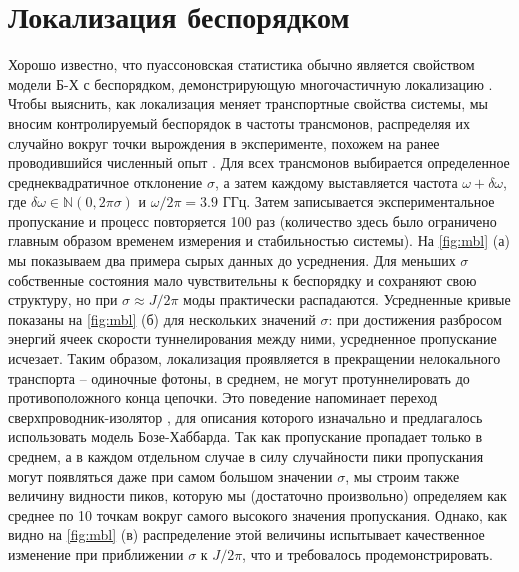 \documentclass[14pt, a4paper]{extreport}
\numberwithin{equation}{section}
\begin{document}
\section{Локализация беспорядком}

Хорошо известно, что пуассоновская статистика обычно является свойством модели Б-Х с беспорядком, демонстрирующую многочастичную локализацию \cite{roushan2017spectroscopic, Yan2019,Ye2019}. Чтобы выяснить, как локализация меняет транспортные свойства системы, мы вносим контролируемый беспорядок в частоты трансмонов, распределяя их случайно вокруг точки вырождения в эксперименте, похожем на ранее проводившийся численный опыт \cite{orell2019probing}. Для всех трансмонов выбирается определенное среднеквадратичное отклонение $\sigma$, а затем каждому выставляется частота $\omega + \delta \omega$, где $\delta \omega \in \mathbb{N}(0, 2\pi \sigma)$ и $\omega/2\pi = 3.9$ ГГц. Затем записывается экспериментальное пропускание и процесс повторяется 100 раз (количество здесь было ограничено главным образом временем измерения и стабильностью системы). На \autoref{fig:mbl} (а) мы показываем два примера сырых данных до усреднения. Для меньших $\sigma$ собственные состояния мало чувствительны к беспорядку и сохраняют свою структуру, но при $\sigma \approx J/2\pi$ моды практически распадаются. Усредненные кривые показаны на \autoref{fig:mbl} (б) для нескольких значений $\sigma$: при достижения разбросом энергий ячеек скорости туннелирования между ними, усредненное пропускание исчезает. Таким образом, локализация проявляется в прекращении нелокального транспорта -- одиночные фотоны, в среднем, не могут протуннелировать до противоположного конца цепочки. Это поведение напоминает переход сверхпроводник-изолятор \cite{bruder1993superconductor}, для описания которого изначально и предлагалось использовать модель Бозе-Хаббарда. Так как пропускание пропадает только в среднем, а в каждом отдельном случае в силу случайности пики пропускания могут появляться даже при самом большом значении $\sigma$, мы строим также величину видности пиков, которую мы (достаточно произвольно) определяем как среднее по 10 точкам вокруг самого высокого значения пропускания. Однако, как видно на \autoref{fig:mbl} (в) распределение этой величины испытывает качественное изменение при приближении $\sigma$ к $J/2\pi$, что и требовалось продемонстрировать.
\end{document}
